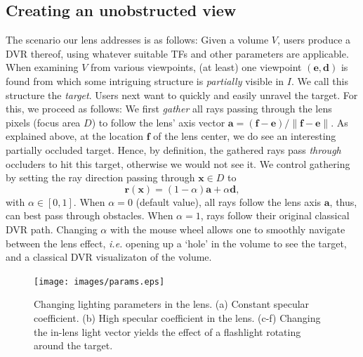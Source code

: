 \subsection{Creating an unobstructed view}
\label{sec:gathering}
%
The scenario our lens addresses is as follows: Given a volume $V$, users produce a DVR thereof, using whatever suitable TFs and other parameters are applicable. When examining $V$ from various viewpoints, (at least) one viewpoint $(\mathbf{e},\mathbf{d})$ is found from which some intriguing structure is \emph{partially} visible in $I$. We call this structure the \emph{target}. Users next want to quickly and easily unravel the target. For this, we proceed as follows: We first \emph{gather} all rays passing through the lens pixels (focus area $D$) to follow the lens' axis vector $\mathbf{a} = (\mathbf{f} - \mathbf{e}) / \| \mathbf{f} - \mathbf{e} \|$. As explained above, at the location $\mathbf{f}$ of the lens center, we do see an interesting partially occluded target. Hence, by definition, the gathered rays pass \emph{through} occluders to hit this target, otherwise we would not see it. We control gathering by setting the ray direction passing through $\mathbf{x} \in D$ to
%
\begin{equation}
\mathbf{r}(\mathbf{x}) = (1-\alpha) \mathbf{a} + \alpha \mathbf{d},
\label{eqn:gathering}
\end{equation}
%
with $\alpha \in [0,1]$. When $\alpha=0$ (default value), all rays follow the lens axis $\mathbf{a}$, thus, can best pass through obstacles. When $\alpha=1$, rays follow their original classical DVR path. Changing $\alpha$ with the mouse wheel allows one to smoothly navigate between the lens effect, \emph{i.e.} opening up a `hole' in the volume to see the target, and a classical DVR visualizaton of the volume.
%
\begin{figure}[htbp]
\centering
\texttt{[image: images/params.eps]}
\vspace{-0.15cm}
\caption{Changing lighting parameters in the lens. (a) Constant specular coefficient. (b) High specular coefficient in the lens. (c-f) Changing the in-lens light vector yields the effect of a flashlight rotating around the target.}
\label{f:params}
\vspace{-0.15cm}
\end{figure}
%
